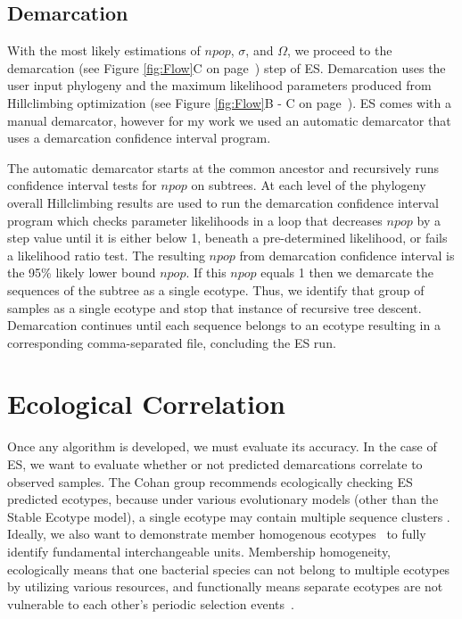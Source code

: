 \subsection*{Demarcation}
With the most likely estimations of $npop$, $\sigma$, and $\Omega$, we proceed to the demarcation (see Figure \ref{fig:Flow}C on page~\pageref{fig:Flow}) step of ES.
Demarcation uses the user input phylogeny and the maximum likelihood parameters produced from Hillclimbing optimization (see Figure \ref{fig:Flow}B - C on page~\pageref{fig:Flow}).
ES comes with a manual demarcator, however for my work we used an automatic demarcator that uses a demarcation confidence interval program.

The automatic demarcator starts at the common ancestor and recursively runs confidence interval tests for $npop$ on subtrees.
At each level of the phylogeny overall Hillclimbing results are used to run the demarcation confidence interval program which checks parameter likelihoods in a loop that decreases $npop$ by a step value until it is either below 1, beneath a pre-determined likelihood, or fails a likelihood ratio test.
The resulting $npop$ from demarcation confidence interval is the 95\% likely lower bound $npop$.
If this $npop$ equals 1 then we demarcate the sequences of the subtree as a single ecotype.
Thus, we identify that group of samples as a single ecotype and stop that instance of recursive tree descent.
Demarcation continues until each sequence belongs to an ecotype resulting in a corresponding comma-separated file, concluding the ES run.

\section{Ecological Correlation}
Once any algorithm is developed, we must evaluate its accuracy.
In the case of ES, we want to evaluate whether or not predicted demarcations correlate to observed samples.
The Cohan group recommends ecologically checking ES predicted ecotypes, because under various evolutionary models (other than the Stable Ecotype model), a single ecotype may contain multiple sequence clusters \cite{koeppel2008identifying, connor2010ecology}.
Ideally, we also want to demonstrate member homogenous ecotypes~\cite{wiedenbeckHGT} to fully identify fundamental interchangeable units.
Membership homogeneity, ecologically means that one bacterial species can not belong to multiple ecotypes by utilizing various resources, and functionally means separate ecotypes are not vulnerable to each other's periodic selection events~\cite{wiedenbeckHGT}.

